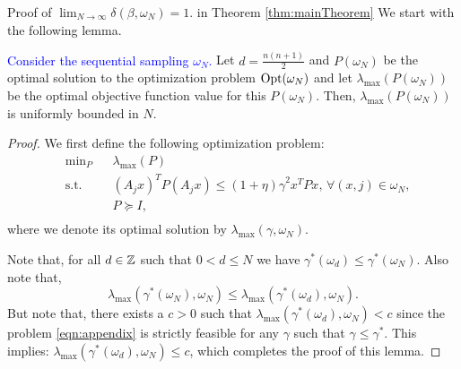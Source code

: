 \begin{subsection}{Proof of  $\lim_{N \to \infty}\delta(\beta, \omega_N) = 1.$ in Theorem \ref{thm:mainTheorem}} \label{app:delta}
We start with the following lemma.
\begin{lemma}\label{lem:bounded}\textcolor{blue}{Consider the sequential sampling $\omega_N$.} Let $d=\frac{n(n+1)}{2}$ and $P(\omega_N)$ be the optimal solution to the optimization problem $\text{Opt}(\omega_N)$ and let $\lambda_{\max}(P(\omega_N))$ be the optimal objective function value for this $P(\omega_N)$. Then, $\lambda_{\max}(P(\omega_N))$ is uniformly bounded in $N$.
\end{lemma}

\begin{proof}We first define the following optimization problem:
\begin{equation}\label{eqn:appendix}
\begin{aligned}
& \text{min}_{P} & & \lambda_{\max}(P) \\
& \text{s.t.} 
&  & (A_j x)^TP(A_j x) \leq {(1 +\eta)\gamma}^2 x^TPx,\,\forall (x, j) \in \omega_N, \\
& && P \succeq I, \\
\end{aligned}
\end{equation}
where we denote its optimal solution by $\lambda_{\max}(\gamma , \omega_N)$.

Note that, for all $d \in \mathbb{Z}$ such that $0< d \leq N$ we have $\gamma^*(\omega_d) \leq \gamma^*(\omega_N)$. Also note that,
\begin{equation*}\lambda_{\max}(\gamma^*(\omega_N), \omega_N) \leq \lambda_{\max}(\gamma^*(\omega_d), \omega_N).
\end{equation*}
But note that, there exists a $c > 0$ such that $\lambda_{\max}(\gamma^*(\omega_d), \omega_N) <  c$ since the problem \eqref{eqn:appendix} is strictly feasible for any $\gamma$ such that $\gamma \leq \gamma^*$. This implies: $\lambda_{\max}(\gamma^*(\omega_d), \omega_N) \leq c$, which completes the proof of this lemma.
\end{proof}


\end{subsection}
